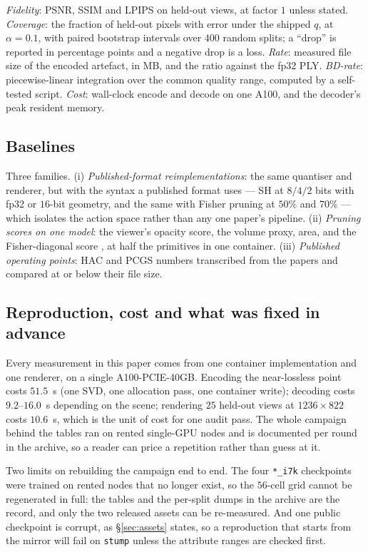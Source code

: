 \documentclass[preprint,number,3p]{elsarticle}
\begin{document}
\emph{Fidelity}: PSNR, SSIM and LPIPS \cite{lpips} on held-out views, at factor $1$ unless stated.
\emph{Coverage}: the fraction of held-out pixels with error under the shipped $q$, at $\alpha = 0.1$, with paired
bootstrap intervals over $400$ random splits; a ``drop'' is reported in percentage points and a negative drop is a
loss. \emph{Rate}: measured file size of the encoded artefact, in MB, and the ratio against the fp32 PLY. \emph{BD-rate}:
piecewise-linear integration over the common quality range, computed by a self-tested script. \emph{Cost}: wall-clock
encode and decode on one A100, and the decoder's peak resident memory.

\subsection{Baselines}
\label{sec:baselines}

Three families. (i) \emph{Published-format reimplementations}: the same quantiser and renderer, but with the syntax a
published format uses --- SH at $8/4/2$ bits with fp32 or $16$-bit geometry, and the same with Fisher pruning at
$50\%$ and $70\%$ --- which isolates the action space rather than any one paper's pipeline. (ii)
\emph{Pruning scores on one model}: the viewer's opacity score, the volume proxy, area, and the Fisher-diagonal
score \cite{pup3dgs}, at half the primitives in one container. (iii) \emph{Published operating points}: HAC
\cite{hac} and PCGS \cite{pcgs} numbers transcribed from the papers and compared at or below their file size.

\subsection{Reproduction, cost and what was fixed in advance}
\label{sec:repro}

Every measurement in this paper comes from one container implementation and one renderer, on a single
A100-PCIE-40GB. Encoding the near-lossless point costs $51.5$~s (one SVD, one allocation pass, one container write);
decoding costs $9.2$--$16.0$~s depending on the scene; rendering $25$ held-out views at $1236 \times 822$ costs
$10.6$~s, which is the unit of cost for one audit pass. The whole campaign behind the tables ran on rented
single-GPU nodes and is documented per round in the archive, so a reader can price a repetition rather than guess
at it.

Two limits on rebuilding the campaign end to end. The four \texttt{*\_i7k} checkpoints were trained on rented
nodes that no longer exist, so the $56$-cell grid cannot be regenerated in full: the tables and the per-split
dumps in the archive are the record, and only the two released assets can be re-measured. And one public
checkpoint is corrupt, as \S\ref{sec:assets} states, so a reproduction that starts from the mirror will fail on
\texttt{stump} unless the attribute ranges are checked first.
\end{document}
